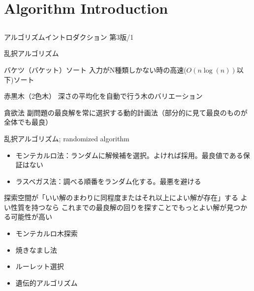 \documentclass{beamer}
\begin{document}
\section{Algorithm Introduction}		%
\subsection{}

\begin{frame}[fragile]{アルゴリズムイントロダクション 第3版/1}{
\href{https://www.amazon.co.jp/アルゴリズムイントロダクション-第3版-総合版：世界標準MIT教科書-Thomas-Cormen-ebook/dp/B078WPYHGN/ref=sr_1_10}{}}

乱択アルゴリズム

\begin{block}{バケツ（バケット）ソート}
入力がN種類しかない時の高速($O(n\log(n))$以下)ソート
\end{block}

\begin{block}{赤黒木（2色木）}
深さの平均化を自動で行う木のバリエーション
\end{block}

\begin{block}{貪欲法}
副問題の最良解を常に選択する動的計画法（部分的に見て最良のものが全体でも最良）
\end{block}
\end{frame}

\begin{frame}[fragile]{乱択アルゴリズム; randomized algorithm}{}
\begin{itemize}%
\item モンテカルロ法：ランダムに解候補を選択。よければ採用。最良値である保証はない
\item ラスベガス法：調べる順番をランダム化する。最悪を避ける
\end{itemize}

\vfill
探索空間が「いい解のまわりに同程度またはそれ以上によい解が存在」する
よい性質を持つなら
これまでの最良解の回りを探すことでもっとよい解が見つかる可能性が高い

\vfill
\begin{itemize}%
\item モンテカルロ木探索
\item 焼きなまし法
\item ルーレット選択
\item 遺伝的アルゴリズム
\end{itemize}
\end{frame}
\end{document}
